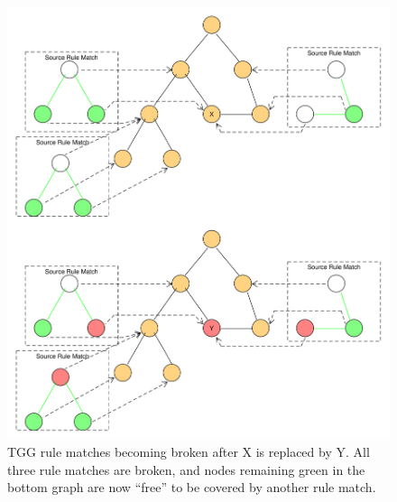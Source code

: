 \begin{figure}
\centering
\includegraphics[width=16cm]{figures/brokenMatchExample.pdf}
\caption[Broken matches example]{TGG rule matches becoming broken after X is replaced by Y. All three rule matches are broken, and nodes remaining green in the bottom graph are now \enquote{free} to be covered by another rule match.}
\label{fig:impl:brokenMatches}
\end{figure}



